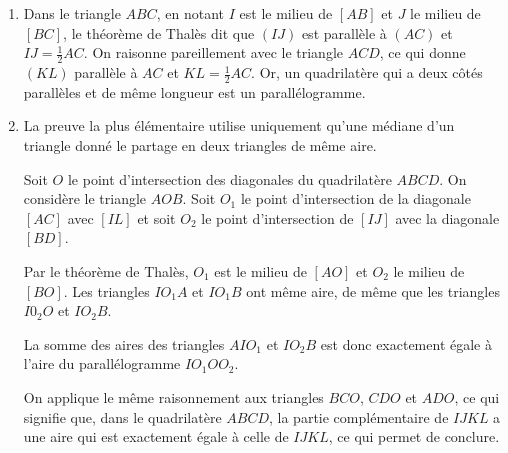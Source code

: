 \begin{Soln}{21}
\begin{enumerate}
\item
Dans le triangle $ABC$, en notant $I$ est le milieu de $[AB]$ et $J$ le milieu de $[BC]$, le théorème de Thalès dit que $(IJ)$ est parall\`ele \`a $(AC)$ et $IJ = \frac{1}{2} AC$. On raisonne pareillement avec le triangle $ACD$, ce qui donne $(KL)$ parall\`ele \`a $AC$ et $KL = \frac{1}{2} AC$. Or, un quadrilat\`ere qui a deux c\^ot\'es parall\`eles et de m\^eme longueur est un parall\'elogramme.

\item La preuve la plus élémentaire utilise uniquement qu'une médiane d'un triangle donné le partage en deux triangles de même aire.

Soit $O$ le point d'intersection des diagonales du quadrilat\`ere $ABCD$. On consid\`ere le triangle $AOB$. Soit $O_1$ le point d'intersection de la diagonale $[AC]$ avec $[IL]$ et soit $O_2$ le point d'intersection de $[IJ]$ avec la diagonale $[BD]$.


Par le théorème de Thalès,  $O_1$ est le milieu de $[AO]$ et $O_2$ le milieu de $[BO]$. Les triangles $IO_1A$ et $IO_1B$ ont même aire, de même que les triangles $I0_2O$ et $IO_2B$.

La somme des aires des triangles $AIO_1$ et $IO_2B$ est donc exactement \'egale \`a l'aire du parall\'elogramme $IO_1OO_2$.

On applique le m\^eme raisonnement aux triangles $BCO$, $CDO$ et $ADO$, ce qui signifie que, dans le quadrilat\`ere $ABCD$, la partie compl\'ementaire de $IJKL$ a une aire qui est exactement \'egale \`a celle de $IJKL$, ce qui permet de conclure. \end{enumerate}

\end{Soln}

